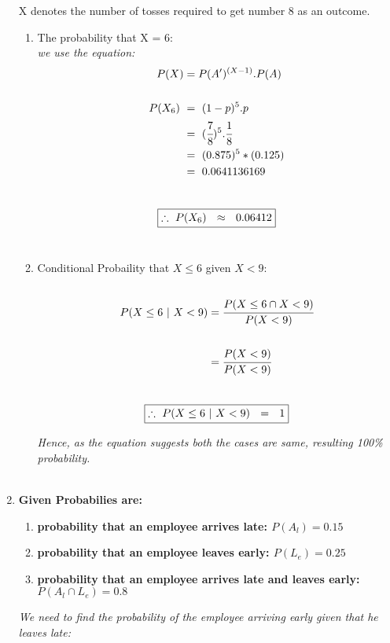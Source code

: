 \documentclass{article}
\begin{document}
\begin{enumerate}
\textnormal{X denotes the number of tosses required to get number 8 as an outcome.}\\
\begin{enumerate}
    \item \textnormal{The probability that X = 6:}\\
    \textit{we use the equation:}
    \begin{align*}
      P(X) & = P(A')^{(X-1)}.P(A)\\\\
      P(X_6)\  & =\  (1-p)^{5}.p\\
      & =\ (\cfrac{7}{8})^{5}.\cfrac{1}{8}\\
      & =\ (0.875)^{5}*(0.125)\\
      & =\ 0.0641136169
    \end{align*}\\
    \[
     \boxed{\therefore\ P(X_6)\ \ \approx \ \ 0.06412}\\
    \]\\
    \item \textnormal{Conditional Probaility that $X \leq 6$ given $X < 9$:}\\\\
    \begin{align*}
      P(X\leq 6 \ | \ X < 9) & = \cfrac{P(X\leq 6 \cap X < 9)}{P(X < 9)}\\\\
      & = \cfrac{P(X < 9)}{P(X < 9)}
    \end{align*}\\
    \[
     \boxed{\therefore\ P(X\leq 6 \ | \ X < 9)\ \ = \ \ 1}\\
    \]

    \textit{Hence, as the equation suggests both the cases are same, resulting 100\% probability.}\\\\

  \end{enumerate}

\newpage
\item\textbf{Given Probabilies are:}\\
  \begin{enumerate}
    \item\textbf{probability that an employee arrives late:  $P(A_l) = 0.15$}
    \item\textbf{probability that an employee leaves early:  $P(L_e) = 0.25$}
    \item\textbf{probability that an employee arrives late and leaves early:  $P(A_l \cap L_e) = 0.8$}\\
  \end{enumerate}
  \textit{We need to find the probability of the employee arriving early given that he leaves late: }


\end{enumerate}
\end{document}
